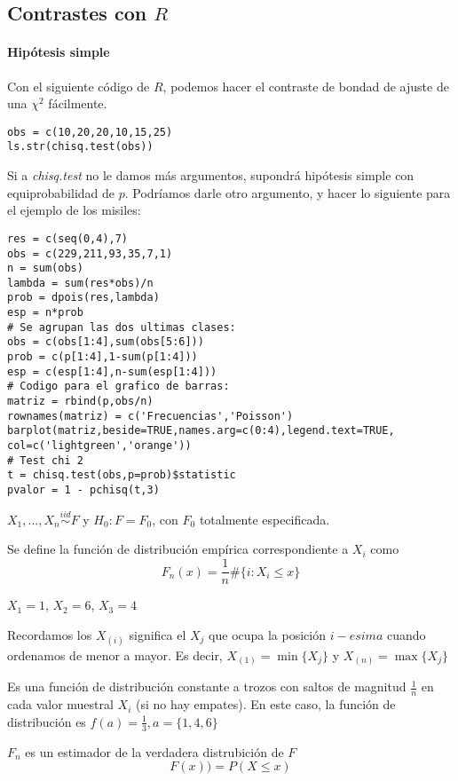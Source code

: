 \subsection{Contrastes con $R$}
\paragraph{Hipótesis simple}
Con el siguiente código de $R$, podemos hacer el contraste de bondad de ajuste de una $\chi^2$ fácilmente.

\begin{lstlisting}[style=mystyle]
obs = c(10,20,20,10,15,25)
ls.str(chisq.test(obs))
\end{lstlisting}

Si a \textit{chisq.test} no le damos más argumentos, supondrá hipótesis simple con equiprobabilidad de $p$. Podríamos darle otro argumento, y hacer lo siguiente para el ejemplo de los misiles:

\begin{lstlisting}[style=mystyle]
res = c(seq(0,4),7)
obs = c(229,211,93,35,7,1)
n = sum(obs)
lambda = sum(res*obs)/n
prob = dpois(res,lambda)
esp = n*prob
# Se agrupan las dos ultimas clases:
obs = c(obs[1:4],sum(obs[5:6]))
prob = c(p[1:4],1-sum(p[1:4]))
esp = c(esp[1:4],n-sum(esp[1:4]))
# Codigo para el grafico de barras:
matriz = rbind(p,obs/n)
rownames(matriz) = c('Frecuencias','Poisson')
barplot(matriz,beside=TRUE,names.arg=c(0:4),legend.text=TRUE,
col=c('lightgreen','orange'))
# Test chi 2
t = chisq.test(obs,p=prob)$statistic
pvalor = 1 - pchisq(t,3)
\end{lstlisting}



\begin{defn}

$X_1,...,X_n \overset{iid}{\sim} F$ y $H_0 : F=F_0$, con $F_0$ totalmente especificada.

Se define la función de distribución empírica correspondiente a $X_i$ como \[F_n(x) = \frac{1}{n}\#\{ i : X_i\leq x\}\]

\end{defn}

\begin{example}
$X_1 = 1$, $X_2 = 6$, $X_3 = 4$

Recordamos los  $X_{(i)}$ significa el $X_j$ que ocupa la posición $i-esima$ cuando ordenamos de menor a mayor. Es decir, $X_{(1)} = \min\{X_j\}$ y $X_{(n)} = \max\{X_j\}$ 

Es una función de distribución constante a trozos con saltos de magnitud $\frac{1}{n}$ en cada valor muestral $X_i$ (si no hay empates). En este caso, la función de distribución es $f(a) = \frac{1}{3}, a=\{1,4,6\}$

$F_n$ es un estimador de la verdadera distrubición de $F$ \[F(x)) = P(X\leq x)\]
\end{example}

